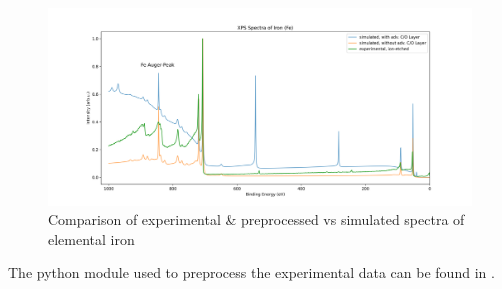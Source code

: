 \begin{figure}
    \includegraphics[width=\textwidth]{Figures/Fe_XPS.png}
    \caption{Comparison of experimental \& preprocessed vs simulated spectra of elemental iron}
    \label{fig:ex_vs_sim}
    \centering
\end{figure}

The python module used to preprocess the experimental data can be found in .